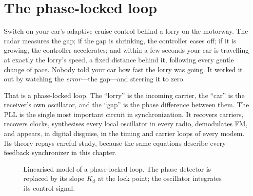 
\section{The phase-locked loop}
\label{sec:ch10:pll}

Switch on your car's adaptive cruise control behind a lorry on the motorway. The radar measures
the gap; if the gap is shrinking, the controller eases off; if it is growing, the controller
accelerates; and within a few seconds your car is travelling at exactly the lorry's speed, a
fixed distance behind it, following every gentle change of pace. Nobody told your car how fast
the lorry was going. It worked it out by watching the \emph{error}---the gap---and steering it to
zero.

That is a phase-locked loop. The ``lorry'' is the incoming carrier, the ``car'' is the
receiver's own oscillator, and the ``gap'' is the phase difference between them. The PLL is the
single most important circuit in synchronization. It recovers carriers, recovers clocks,
synthesises every local oscillator in every radio, demodulates FM, and appears, in digital
disguise, in the timing and carrier loops of every modem. Its theory repays careful study,
because the same equations describe every feedback synchronizer in this chapter.

\begin{figure}[htbp]\centering
{}
\caption{Linearised model of a phase-locked loop. The phase detector is replaced by its slope
$K_d$ at the lock point; the oscillator integrates its control signal.}
\label{fig:ch10_pll_model}
\end{figure}

